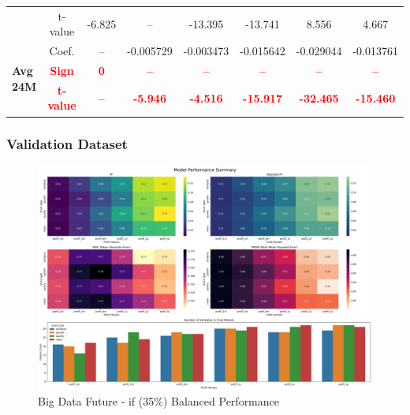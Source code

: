 \documentclass[11pt,english,a4paper,hidelinks]{book}
\begin{document}
\begin{table}[H]
\begin{tabular}{lccccccc}
            & t-value & -6.825    & --        & -13.395   & -13.741   & 8.556     & 4.667     \\
        \cmidrule{1-8}
        \multirow{3}{*}{\textbf{Avg 24M}}
            & Coef.   & --        & -0.005729 & -0.003473 & -0.015642 & -0.029044 & -0.013761 \\
            & \textbf{\textcolor{red}{Sign}}    & \textbf{\textcolor{red}{0}}         & \textbf{\textcolor{red}{–}}         & \textbf{\textcolor{red}{–}}         & \textbf{\textcolor{red}{–}}         & \textbf{\textcolor{red}{–}}         & \textbf{\textcolor{red}{–}}         \\
            & \textbf{\textcolor{red}{t-value}} & \textbf{\textcolor{red}{--}}        & \textbf{\textcolor{red}{-5.946}}    & \textbf{\textcolor{red}{-4.516}}    & \textbf{\textcolor{red}{-15.917}}   & \textbf{\textcolor{red}{-32.465}}   & \textbf{\textcolor{red}{-15.460}}   \\
        \bottomrule
    \end{tabular}
    \label{tab:africa_middle_east_value_consistency}
\end{table}

\subsubsection{Validation Dataset}

\begin{figure}[H]
    \centering
    \includegraphics[width=1\textwidth]{images/code/models/linear_regression/first_model/Big Data future - IF HARD Balanced - Gaussian performance.png}
    \caption{Big Data Future - \acrshort{if} (35\%) Balanced Performance}
    \label{fig:linear_regression_performance_if_hard_balanced_gaussian}
\end{figure}
\end{document}
